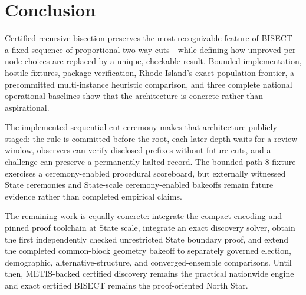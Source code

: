 \section{Conclusion}

Certified recursive bisection preserves the most recognizable feature of
BISECT---a fixed sequence of proportional two-way cuts---while defining how
unproved per-node choices are replaced by a unique, checkable result. Bounded
implementation, hostile fixtures, package verification, Rhode Island's exact
population frontier, a precommitted multi-instance heuristic comparison, and
three complete national operational baselines show
that the architecture is concrete rather than aspirational.

The implemented sequential-cut ceremony makes that architecture publicly
staged: the rule is committed before the root, each later depth waits for a
review window, observers can verify disclosed prefixes without future cuts,
and a challenge can preserve a permanently halted record. The bounded path-8
fixture exercises a ceremony-enabled procedural scoreboard, but externally
witnessed State ceremonies and State-scale ceremony-enabled bakeoffs remain
future evidence rather than completed empirical claims.

The remaining work is equally concrete: integrate the compact encoding and
pinned proof toolchain at State scale, integrate an exact discovery solver,
obtain the first independently checked unrestricted State boundary proof, and
extend the completed common-block geometry bakeoff to separately governed
election, demographic, alternative-structure, and converged-ensemble
comparisons. Until then, METIS-backed
certified discovery remains the practical nationwide engine and exact
certified BISECT remains the proof-oriented North Star.
